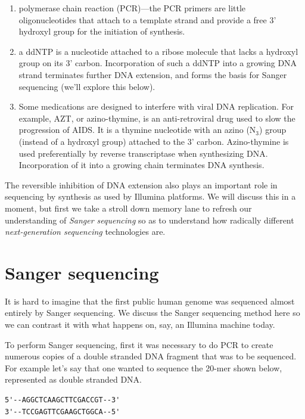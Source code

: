 \documentclass[]{krantz}
\providecommand{\tightlist}{%
  \setlength{\itemsep}{0pt}\setlength{\parskip}{0pt}}
\begin{document}
\begin{enumerate}
\def\labelenumi{\arabic{enumi}.}
\tightlist
\item
  polymerase chain reaction (PCR)---the PCR primers are little oligonucleotides
  that attach to a template strand and provide a free 3' hydroxyl group for the initiation
  of synthesis.
\item
  a ddNTP is a nucleotide attached to a ribose molecule
  that lacks a hydroxyl group on its 3' carbon. Incorporation of
  such a ddNTP into a growing DNA strand terminates further DNA extension, and forms
  the basis for Sanger sequencing (we'll explore this below).
\item
  Some medications are designed to interfere with viral DNA replication. For example,
  AZT, or azino-thymine, is an anti-retroviral drug used to slow the progression of AIDS.
  It is a thymine nucleotide with an azino (\(\mathrm{N}_3\)) group (instead
  of a hydroxyl group) attached to the 3' carbon. Azino-thymine is used preferentially
  by reverse transcriptase when synthesizing DNA. Incorporation of it into a growing
  chain terminates DNA synthesis.
\end{enumerate}

The reversible inhibition of DNA extension also plays an important role in
sequencing by synthesis as used by Illumina platforms. We will discuss
this in a moment, but first we take a stroll down memory lane to refresh our
understanding of \emph{Sanger sequencing} so as to understand how radically different
\emph{next-generation sequencing} technologies are.

\hypertarget{sanger-sequencing}{%
\section{Sanger sequencing}\label{sanger-sequencing}}

It is hard to imagine that the first public human genome was sequenced almost
entirely by Sanger sequencing. We discuss the Sanger sequencing method
here so we can contrast it with what happens on, say, an Illumina machine
today.

To perform Sanger sequencing, first it was necessary to do PCR to
create numerous copies of a double stranded DNA fragment that was to be
sequenced. For example let's say that one wanted to sequence the
20-mer shown below, represented as double stranded DNA.

\begin{verbatim}
5'--AGGCTCAAGCTTCGACCGT--3'
3'--TCCGAGTTCGAAGCTGGCA--5'
\end{verbatim}
\end{document}
